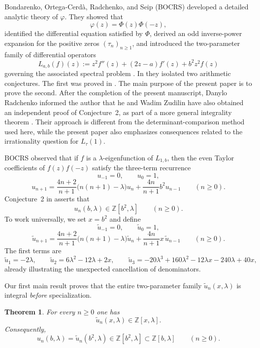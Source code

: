 \documentclass[11pt,letterpaper]{amsart}
\numberwithin{equation}{section}
\theoremstyle{plain}
\newtheorem{theorem}{Theorem}
\theoremstyle{remark}
\newcommand{\Z}{\mathbb{Z}}
\begin{document}
Bondarenko, Ortega-Cerd\`a, Radchenko, and Seip (BOCRS) developed a detailed analytic theory of
\(\varphi\). They showed that
\[
\varphi(z)=\Phi(z)\Phi(-z),
\]
identified the differential equation satisfied by \(\Phi\), derived an odd inverse-power
expansion for the positive zeros \((\tau_n)_{n\ge1}\), and introduced the two-parameter
family of differential operators
\[
L_{a,b}(f)(z):=z^2f''(z)+(2z-a)f'(z)+b^2z^2f(z)
\]
governing the associated spectral problem \cite{BOCRS}. In \cite[\S10.2--\S10.3]{BOCRS} they
isolated two arithmetic conjectures. The first was proved in \cite{NguyenDangHB}. The main
purpose of the present paper is to prove the second. After the completion of the present manuscript, Danylo Radchenko informed the author that he and Wadim Zudilin have also obtained an independent proof of Conjecture~2, as part of a more general integrality theorem \cite{DZforthcoming}. Their approach is different from the determinant-comparison method used here, while the present paper also emphasizes consequences related to the irrationality question for \(L_\tau(1)\).

BOCRS observed that if \(f\) is a \(\lambda\)-eigenfunction of \(L_{1,b}\), then the even
Taylor coefficients of \(f(z)f(-z)\) satisfy the three-term recurrence
\[
u_{-1}=0,\qquad u_0=1,
\]
\[
u_{n+1}
=
\frac{4n+2}{n+1}\bigl(n(n+1)-\lambda\bigr)u_n
+
\frac{4n}{n+1}b^2u_{n-1}
\qquad(n\ge0).
\]
Conjecture~2 in \cite[\S10.3]{BOCRS} asserts that
\[
u_n(b,\lambda)\in \Z[b^2,\lambda]
\qquad(n\ge0).
\]
To work universally, we set \(x=b^2\) and define
\[
\widetilde u_{-1}=0,\qquad \widetilde u_0=1,
\]
\[
\widetilde u_{n+1}
=
\frac{4n+2}{n+1}\bigl(n(n+1)-\lambda\bigr)\widetilde u_n
+
\frac{4n}{n+1}x\,\widetilde u_{n-1}
\qquad(n\ge0).
\]
The first terms are
\[
\widetilde u_1=-2\lambda,\qquad
\widetilde u_2=6\lambda^2-12\lambda+2x,\qquad
\widetilde u_3=-20\lambda^3+160\lambda^2-12\lambda x-240\lambda+40x,
\]
already illustrating the unexpected cancellation of denominators.

Our first main result proves that the entire two-parameter family $\widetilde u_n(x,\lambda)$ is integral \emph{before} specialization.
\begin{theorem}\label{thm:main}
For every $n\ge 0$ one has
\[
 \widetilde u_n(x,\lambda)\in \Z[x,\lambda].
\]
Consequently,
\[
 u_n(b,\lambda)=\widetilde u_n(b^2,\lambda)\in \Z[b^2,\lambda]\subset \Z[b,\lambda]
\qquad(n\ge 0).
\]
\end{theorem}
\end{document}
